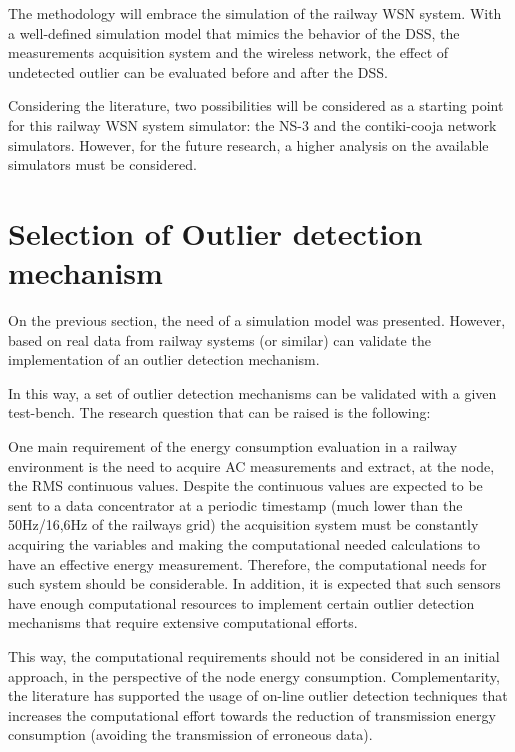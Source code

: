The methodology will embrace the simulation of the railway WSN system. With a well-defined simulation model that mimics the behavior of the DSS, the measurements acquisition system and the wireless network, the effect of undetected outlier can be evaluated before and after the DSS.

Considering the literature, two possibilities will be considered as a starting point for this railway WSN system simulator: the NS-3 and the contiki-cooja network simulators. However, for the future research, a higher analysis on the available simulators must be considered.


\section{Selection of Outlier detection mechanism}

On the previous section, the need of a simulation model was presented. However, based on real data from railway systems (or similar) can validate the implementation of an outlier detection mechanism.

In this way, a set of outlier detection mechanisms can be validated with a given test-bench. The research question that can be raised is the following:

\vspace{0.5em}
{}\par
\vspace{1.5em}

One main requirement of the energy consumption evaluation in a railway environment is the need to acquire AC measurements and extract, at the node, the RMS continuous values. Despite the continuous values are expected to be sent to a data concentrator at a periodic timestamp (much lower than the 50Hz/16,6Hz of the railways grid) the acquisition system must be constantly acquiring the variables and making the computational needed calculations to have an effective energy measurement. Therefore, the computational needs for such system should be considerable. In addition, it is expected that such sensors have enough computational resources to implement certain outlier detection mechanisms that require extensive computational efforts.

This way, the computational requirements should not be considered in an initial approach, in the perspective of the node energy consumption. Complementarity, the literature has supported the usage of on-line outlier detection techniques that increases the computational effort towards the reduction of transmission energy consumption (avoiding the transmission of erroneous data).

